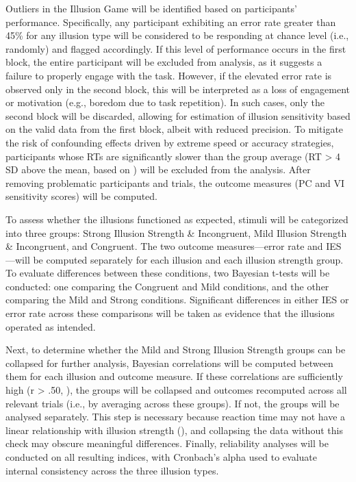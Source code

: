 \documentclass[
  man,
  floatsintext,
  longtable,
  nolmodern,
  notxfonts,
  notimes,
  colorlinks=true,linkcolor=blue,citecolor=blue,urlcolor=blue]{apa7}
\begin{document}
Outliers in the Illusion Game will be identified based on participants'
performance. Specifically, any participant exhibiting an error rate
greater than 45\% for any illusion type will be considered to be
responding at chance level (i.e., randomly) and flagged accordingly. If
this level of performance occurs in the first block, the entire
participant will be excluded from analysis, as it suggests a failure to
properly engage with the task. However, if the elevated error rate is
observed only in the second block, this will be interpreted as a loss of
engagement or motivation (e.g., boredom due to task repetition). In such
cases, only the second block will be discarded, allowing for estimation
of illusion sensitivity based on the valid data from the first block,
albeit with reduced precision. To mitigate the risk of confounding
effects driven by extreme speed or accuracy strategies, participants
whose RTs are significantly slower than the group average (RT
\textgreater{} 4 SD above the mean, based on
) will be excluded
from the analysis. After removing problematic participants and trials,
the outcome measures (PC and VI sensitivity scores) will be computed.

To assess whether the illusions functioned as expected, stimuli will be
categorized into three groups: Strong Illusion Strength \& Incongruent,
Mild Illusion Strength \& Incongruent, and Congruent. The two outcome
measures---error rate and IES---will be computed separately for each
illusion and each illusion strength group. To evaluate differences
between these conditions, two Bayesian t-tests will be conducted: one
comparing the Congruent and Mild conditions, and the other comparing the
Mild and Strong conditions. Significant differences in either IES or
error rate across these comparisons will be taken as evidence that the
illusions operated as intended.

Next, to determine whether the Mild and Strong Illusion Strength groups
can be collapsed for further analysis, Bayesian correlations will be
computed between them for each illusion and outcome measure. If these
correlations are sufficiently high (r \textgreater{} .50,
), the groups will be
collapsed and outcomes recomputed across all relevant trials (i.e., by
averaging across these groups). If not, the groups will be analysed
separately. This step is necessary because reaction time may not have a
linear relationship with illusion strength
(), and collapsing the
data without this check may obscure meaningful differences. Finally,
reliability analyses will be conducted on all resulting indices, with
Cronbach's alpha used to evaluate internal consistency across the three
illusion types.
\end{document}
